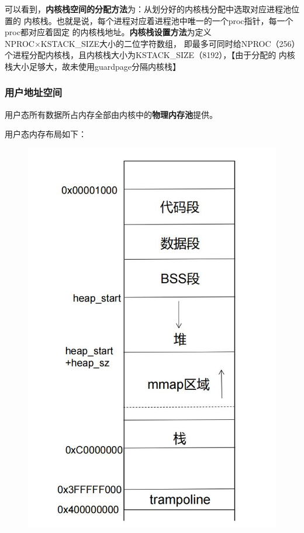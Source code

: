 \documentclass[UTF8,a4paper,10pt]{ctexart}
\begin{document}
可以看到，\textbf{内核栈空间的分配方法}为：从划分好的内核栈分配中选取对应进程池位置的
内核栈。也就是说，每个进程对应着进程池中唯一的一个proc指针，每一个proc都对应着固定
的内核栈地址。\textbf{内核栈设置方法}为定义NPROC×KSTACK\_SIZE大小的二位字符数组，
即最多可同时给NPROC（256）个进程分配内核栈，且内核栈大小为KSTACK\_SIZE（8192），【由于分配的
内核栈大小足够大，故未使用guardpage分隔内核栈】

\subsubsection{用户地址空间}

用户态所有数据所占内存全部由内核中的\textbf{物理内存池}提供。

用户态内存布局如下：

\begin{figure}[H]
  \centering
  \includegraphics[scale=0.5]{image/mem03.jpg}
\end{figure}
\end{document}
